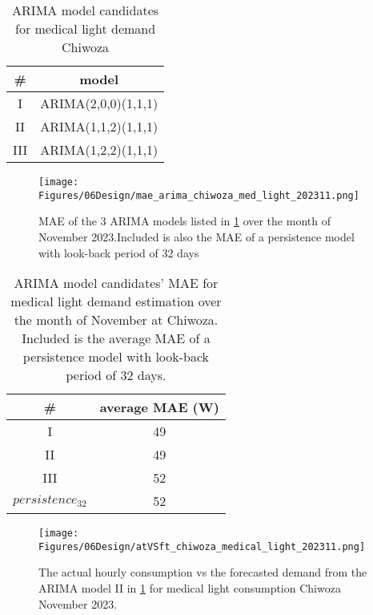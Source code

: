 \begin{table}[]
    \centering
    \begin{tabular}{c|c}
         \#& model \\
         \hline
         I& ARIMA(2,0,0)(1,1,1)\\
         II& ARIMA(1,1,2)(1,1,1)\\
         III& ARIMA(1,2,2)(1,1,1)\\
    \end{tabular}
    \caption[ARIMA candidates medical light demand Chiwoza]{ARIMA model candidates for medical light demand Chiwoza}
    \label{tab:arima_candidate_chiwoza_med_light}
\end{table}

\begin{figure}[]
    \centering
    \texttt{[image: Figures/06Design/mae\_arima\_chiwoza\_med\_light\_202311.png]}
    \caption[MAE ARIMA candidates medical light demand Chiwoza]{MAE of the 3 ARIMA models listed in \ref{tab:arima_candidate_chiwoza_med_light} over the month of November 2023.Included is also the MAE of a persistence model with look-back period of 32 days}
    \label{fig:mae_arima_chiwoza_med_light_202311}
\end{figure}

\begin{table}[]
    \centering
    \begin{tabular}{c|c}
         \#& average MAE (W) \\
         \hline
         I& 49\\
         II& 49\\
         III& 52\\
         $persistence_{32}$& 52\\
    \end{tabular}
    \caption[Average MAE ARIMA candidates and persistence model medical light demand Chiwoza]{ARIMA model candidates' MAE for medical light demand estimation over the month of November at Chiwoza. Included is the average MAE of a persistence model with look-back period of 32 days.}
    \label{tab:arima_candidate_mae_chiwoza_med_light}
\end{table}

\begin{figure}[]
    \centering
    \texttt{[image: Figures/06Design/atVSft\_chiwoza\_medical\_light\_202311.png]}
    \caption[Actual vs Forecasted medical light demand]{The actual hourly consumption vs the forecasted demand from the ARIMA model II in \ref{tab:arima_candidate_chiwoza_med_light} for medical light consumption Chiwoza November 2023.}
    \label{fig:atVSft_chiwoza_medical_light_202311}
\end{figure}

